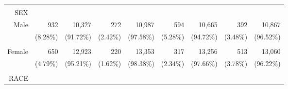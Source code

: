 \documentclass{article}
\begin{document}
\begin{table}[!h]
{\begin{tabular}{lllllllll}
			\multicolumn{1}{r}{} &
			\multicolumn{1}{r}{} &
			\multicolumn{1}{r}{} &
			\multicolumn{1}{r}{} &
			\multicolumn{1}{r}{} &
			\multicolumn{1}{r}{} &
			\multicolumn{1}{r}{} \\
			\multicolumn{1}{r}{SEX} &
			\multicolumn{1}{|r}{} &
			\multicolumn{1}{r}{} &
			\multicolumn{1}{r}{} &
			\multicolumn{1}{r}{} &
			\multicolumn{1}{r}{} &
			\multicolumn{1}{r}{} &
			\multicolumn{1}{r}{} &
			\multicolumn{1}{r}{} \\
			\multicolumn{1}{r}{Male\hspace{1em}} &
			\multicolumn{1}{|r}{932} &
			\multicolumn{1}{r}{10,327} &
			\multicolumn{1}{r}{272} &
			\multicolumn{1}{r}{10,987} &
			\multicolumn{1}{r}{594} &
			\multicolumn{1}{r}{10,665} &
			\multicolumn{1}{r}{392} &
			\multicolumn{1}{r}{10,867} \\
			\multicolumn{1}{r}{} &
			\multicolumn{1}{|r}{(8.28\%)} &
			\multicolumn{1}{r}{(91.72\%)} &
			\multicolumn{1}{r}{(2.42\%)} &
			\multicolumn{1}{r}{(97.58\%)} &
			\multicolumn{1}{r}{(5.28\%)} &
			\multicolumn{1}{r}{(94.72\%)} &
			\multicolumn{1}{r}{(3.48\%)} &
			\multicolumn{1}{r}{(96.52\%)} \\
			\multicolumn{1}{r}{} &
			\multicolumn{1}{|r}{} &
			\multicolumn{1}{r}{} &
			\multicolumn{1}{r}{} &
			\multicolumn{1}{r}{} &
			\multicolumn{1}{r}{} &
			\multicolumn{1}{r}{} &
			\multicolumn{1}{r}{} &
			\multicolumn{1}{r}{} \\
			\multicolumn{1}{r}{Female\hspace{1em}} &
			\multicolumn{1}{|r}{650} &
			\multicolumn{1}{r}{12,923} &
			\multicolumn{1}{r}{220} &
			\multicolumn{1}{r}{13,353} &
			\multicolumn{1}{r}{317} &
			\multicolumn{1}{r}{13,256} &
			\multicolumn{1}{r}{513} &
			\multicolumn{1}{r}{13,060} \\
			\multicolumn{1}{r}{} &
			\multicolumn{1}{|r}{(4.79\%)} &
			\multicolumn{1}{r}{(95.21\%)} &
			\multicolumn{1}{r}{(1.62\%)} &
			\multicolumn{1}{r}{(98.38\%)} &
			\multicolumn{1}{r}{(2.34\%)} &
			\multicolumn{1}{r}{(97.66\%)} &
			\multicolumn{1}{r}{(3.78\%)} &
			\multicolumn{1}{r}{(96.22\%)} \\
			\multicolumn{1}{r}{} &
			\multicolumn{1}{|r}{} &
			\multicolumn{1}{r}{} &
			\multicolumn{1}{r}{} &
			\multicolumn{1}{r}{} &
			\multicolumn{1}{r}{} &
			\multicolumn{1}{r}{} &
			\multicolumn{1}{r}{} &
			\multicolumn{1}{r}{} \\
			\multicolumn{1}{r}{RACE} &
			\multicolumn{1}{|r}{} &
			\multicolumn{1}{r}{} &
			\multicolumn{1}{r}{} &
			\multicolumn{1}{r}{} &

\end{tabular}}
\end{table}
\end{document}
